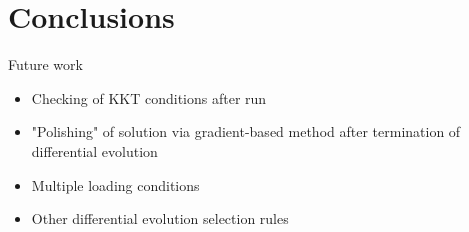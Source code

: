 \documentclass{report}
\begin{document}
\section{Conclusions}
Future work
\begin{itemize}
  \item Checking of KKT conditions after run
  \item "Polishing" of solution via gradient-based method after termination of differential evolution
  \item Multiple loading conditions
  \item Other differential evolution selection rules
\end{itemize}

\printbibliography
\end{document}
